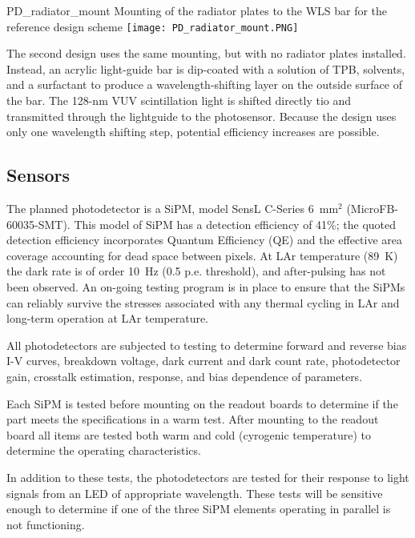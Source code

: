 \begin{cdrfigure}{PD_radiator_mount}
  {Mounting of the radiator plates to the WLS bar for the reference design scheme}
\texttt{[image: PD\_radiator\_mount.PNG]}
\end{cdrfigure}

The second design uses the same mounting, but with no radiator plates installed.  
Instead, an acrylic light-guide bar is dip-coated  with a solution
of TPB, solvents, and a surfactant to produce a wavelength-shifting layer on the
outside surface of the bar.
The 128-nm VUV scintillation light is shifted directly tio  and transmitted
through the lightguide to the photosensor. Because the design uses only one wavelength shifting step, potential efficiency increases are possible.


\subsection{Sensors}

The planned photodetector is a SiPM, model 
SensL C-Series 6~mm$^2$
(MicroFB-60035-SMT). %
This model of SiPM has a detection efficiency of
41\%; the quoted detection efficiency incorporates Quantum Efficiency (QE) and 
the effective area
  coverage accounting for dead space between pixels.   At LAr temperature (89~K) the dark rate is of order 10~Hz
(0.5 p.e. threshold), and  after-pulsing has not been observed. An on-going testing program is in place to ensure 
that the SiPMs can reliably survive the stresses associated with 
any thermal cycling in LAr and long-term operation at LAr temperature.

All photodetectors %
are subjected to testing to determine
 forward and reverse bias I-V curves,
 breakdown voltage, dark current and dark count rate, photodetector gain, crosstalk estimation, response, and bias dependence of parameters.
 
Each SiPM is tested before mounting on the readout boards to determine
if the part meets the specifications in a warm test.  After mounting to
the readout board all items are tested both warm and cold (cyrogenic 
temperature) to determine the operating characteristics.

In addition to these tests, the photodetectors are tested for their
response to light signals from an LED of appropriate wavelength.
These tests will be sensitive enough to determine if one of the three SiPM
elements operating in parallel is not functioning.



